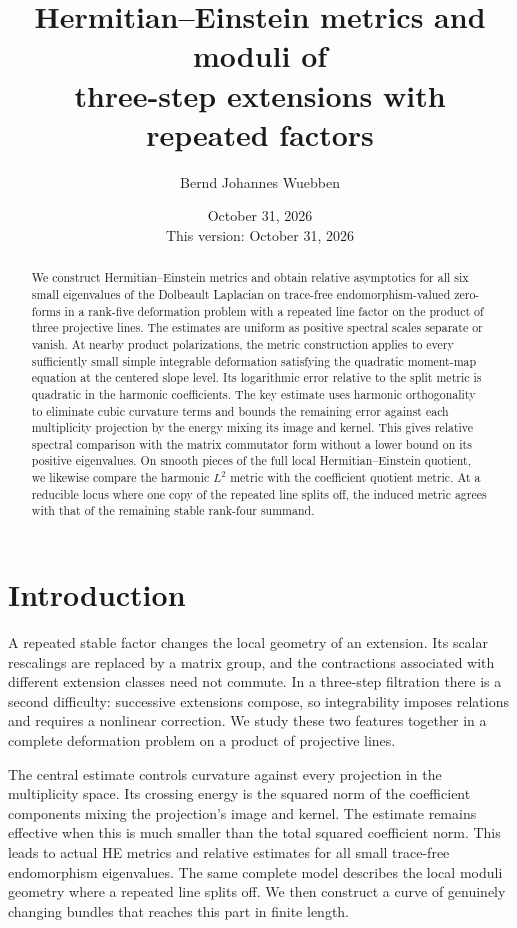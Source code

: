 \documentclass[11pt]{amsart}
\title[HE metrics and moduli with repeated factors]{Hermitian--Einstein metrics and moduli of\\three-step extensions with repeated factors}
\author{Bernd Johannes Wuebben}
\date{October 31, 2026\\This version: October 31, 2026}
\theoremstyle{definition}
\theoremstyle{remark}
\begin{document}
\begin{abstract}
We construct Hermitian--Einstein metrics and obtain relative asymptotics
for all six small eigenvalues of the Dolbeault Laplacian on trace-free
endomorphism-valued zero-forms in a rank-five
deformation problem with a repeated line factor on the product of
three projective lines. The estimates are uniform as positive spectral
scales separate or vanish. At nearby product polarizations, the metric
construction applies to every sufficiently small simple integrable
deformation satisfying the quadratic moment-map equation at the
centered slope level. Its logarithmic error relative to the split
metric is quadratic in the harmonic coefficients. The key estimate
uses harmonic orthogonality to eliminate cubic curvature terms and
bounds the remaining error against each multiplicity projection by
the energy mixing its image and kernel. This gives relative spectral
comparison with the matrix commutator form without a lower bound on
its positive eigenvalues. On smooth pieces of the full local
Hermitian--Einstein quotient, we likewise compare the harmonic $L^2$
metric with the coefficient quotient metric. At a reducible locus
where one copy of the repeated line splits off, the induced metric
agrees with that of the remaining stable rank-four summand.
\end{abstract}

\maketitle


\section{Introduction}\label{sec:introduction}

A repeated stable factor changes the local geometry of an extension.
Its scalar rescalings are replaced by a matrix group, and the
contractions associated with different extension classes need not
commute. In a three-step filtration there is a second difficulty:
successive extensions compose, so integrability imposes relations and
requires a nonlinear correction. We study these two features together
in a complete deformation problem on a product of projective lines.

The central estimate controls curvature against every projection in
the multiplicity space. Its crossing energy is the squared norm of the
coefficient components mixing the projection's image and kernel.
The estimate remains effective when this is much smaller than the
total squared coefficient norm.
This leads to actual HE metrics and relative estimates for all small
trace-free endomorphism eigenvalues. The same complete model describes the local
moduli geometry where a repeated line splits off. We then construct a
curve of genuinely changing bundles that reaches this part in finite
length.
\end{document}
